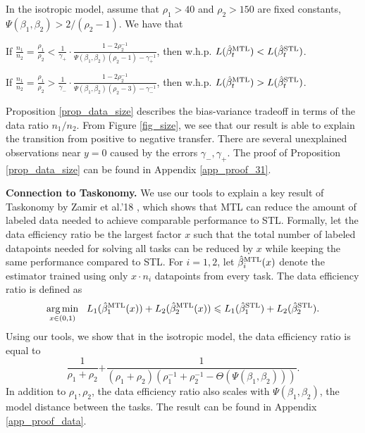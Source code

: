 \begin{proposition}\label{prop_data_size}
	In the isotropic model, assume that $\rho_1 > 40$ and $\rho_2 > 150$ are fixed constants, $\Psi(\beta_1, \beta_2) > 2/(\rho_2 - 1)$.
	We have that
	\squishlist
		\item If $\frac{n_1}{n_2} = \frac{\rho_1}{\rho_2} < \frac{1}{\gamma_+} \cdot \frac{1 - 2\rho_2^{-1}}{\Psi(\beta_1, \beta_2) (\rho_2 - 1) - \gamma_+^{-1}}$, then w.h.p. $L(\hat{\beta}_t^{\text{MTL}}) < L(\hat{\beta}_t^{\text{STL}})$.
		\item If $\frac{n_1}{n_2} = \frac{\rho_1}{\rho_2} > \frac{1}{\gamma_-} \cdot \frac{1 - 2\rho_2^{-1}}{\Psi(\beta_1, \beta_2) (\rho_2 - 3) - \gamma_{-}^{-1}}$, then w.h.p. $L(\hat{\beta}_t^{\text{MTL}}) > L(\hat{\beta}_t^{\text{STL}})$.
	\squishend
\end{proposition}
Proposition \ref{prop_data_size} describes the bias-variance tradeoff in terms of the data ratio $n_1 / n_2$.
From Figure \ref{fig_size}, we see that our result is able to explain the transition from positive to negative transfer.
There are several unexplained observations near $y = 0$ caused by the errors $\gamma_-, \gamma_+$.
The proof of Proposition \ref{prop_data_size} can be found in Appendix \ref{app_proof_31}.

\textbf{Connection to Taskonomy.} We use our tools to explain a key result of Taskonomy by Zamir et al.'18 \cite{ZSSGM18}, which shows that MTL can reduce the amount of labeled data needed to achieve comparable performance to STL.
Formally, let the data efficiency ratio be the largest factor $x$ such that the total number of labeled datapoints needed for solving all tasks can be reduced by $x$ while keeping the same performance compared to STL.
For $i = 1, 2$, let $\hat{\beta}_i^{\text{MTL}}(x)$ denote the estimator trained using only $x \cdot n_i$ datapoints from every task.
The data efficiency ratio is defined as
\[ \operatorname*{arg\,min}_{x\in(0, 1)} ~~
		L_1(\hat{\beta}_1^{\text{MTL}}(x)) + L_2(\hat{\beta}_2^{\text{MTL}}(x))
		\leqslant L_1(\hat{\beta}_1^{\text{STL}}) + L_2(\hat{\beta}_2^{\text{STL}}). \]
Using our tools, we show that in the isotropic model, the data efficiency ratio is
equal to \[ \frac{1}{\rho_1 + \rho_2} {+ \frac{1}{(\rho_1 +\rho_2)(\rho_1^{-1} + \rho_2^{-1} - \Theta(\Psi(\beta_1, \beta_2)))}}. \]
In addition to $\rho_1,\rho_2$, the data efficiency ratio also scales with $\Psi(\beta_1, \beta_2)$, the model distance between the tasks.
The result can be found in Appendix \ref{app_proof_data}.

